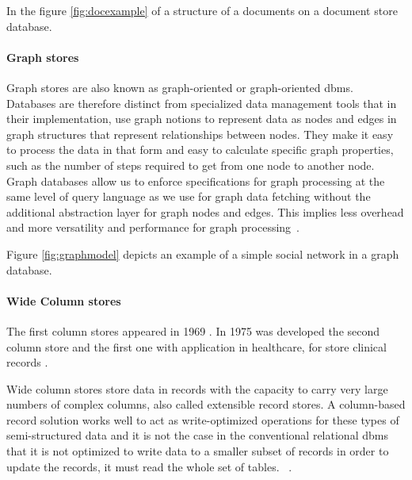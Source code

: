In the figure \ref{fig:docexample} of a structure of a documents on a document store database.



\paragraph{Graph stores}

Graph stores are also known as graph-oriented or graph-oriented \gls{dbms}.
Databases are therefore distinct from specialized data management tools that in their implementation, use graph notions to represent data as nodes and edges in graph structures that represent relationships between nodes. They make it easy to process the data in that form and easy to calculate specific graph properties, such as the number of steps required to get from one node to another node. Graph databases allow us to enforce specifications for graph processing at the same level of query language as we use for graph data fetching without the additional abstraction layer for graph nodes and edges. This implies less overhead and more versatility and performance for graph processing~\cite{6313676,angles2008survey,nosqlchoose}.

Figure \ref{fig:graphmodel} depicts an example of a simple social network in a graph database.



\paragraph{Wide Column stores}

The first column stores appeared in 1969 \cite{abadi2009column}. In 1975 was developed the second column store and the first one with application in healthcare, for store clinical records \cite{WEYL1975279}.

Wide column stores store data in records with the capacity to carry very large numbers of complex columns, also called extensible record stores. A column-based record solution works well to act as write-optimized operations for these types of semi-structured data and it is not the case in the conventional relational \gls{dbms} that it is not optimized to write data to a smaller subset of records in order to update the records, it must read the whole set of tables. ~\cite{wuoverview,nosqlchoose}.

